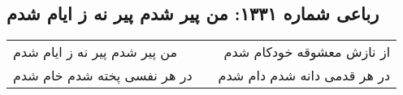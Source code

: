 \begin{center}
\section*{رباعی شماره ۱۳۳۱: من پیر شدم پیر نه ز ایام شدم}
\label{sec:1331}
\begin{longtable}{l p{0.5cm} r}
من پیر شدم پیر نه ز ایام شدم
&&
از نازش معشوقه خودکام شدم
\\
در هر نفسی پخته شدم خام شدم
&&
در هر قدمی دانه شدم دام شدم
\\
\end{longtable}
\end{center}
